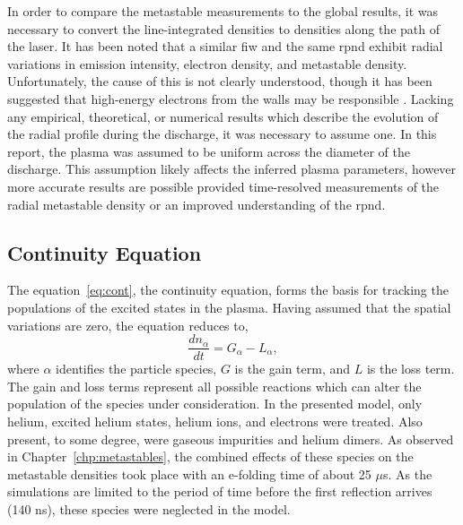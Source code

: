 In order to compare the metastable measurements to the global results, it was
necessary to convert the line-integrated densities to densities along the path
of the laser. It has been noted that a similar \acs{fiw} \cite{Vasilyak1994} and
the same \acs{rpnd} \cite{Weatherford2012} exhibit radial variations in emission
intensity, electron density, and metastable density. Unfortunately, the cause of
this is not clearly understood, though it has been suggested that high-energy
electrons from the walls may be responsible \cite{Weatherford2012a}. Lacking any
empirical, theoretical, or numerical results which describe the evolution of the
radial profile during the discharge, it was necessary to assume one. In this
report, the plasma was assumed to be uniform across the diameter of the
discharge. This assumption likely affects the inferred plasma parameters,
however more accurate results are possible provided time-resolved measurements
of the radial metastable density or an improved understanding of the \acs{rpnd}.

\subsection{Continuity Equation}

The equation~\ref{eq:cont}, the continuity equation, forms the basis for
tracking the populations of the excited states in the plasma. Having assumed
that the spatial variations are zero, the equation reduces to,
\begin{equation}
  \frac{d n_\alpha}{dt} = G_\alpha - L_\alpha,
  \label{eq:zdmcont}
\end{equation}
where $\alpha$ identifies the particle species, $G$ is the gain term, and $L$ is
the loss term. The gain and loss terms represent all possible reactions which
can alter the population of the species under consideration. In the presented
model, only helium, excited helium states, helium ions, and electrons were
treated. Also present, to some degree, were gaseous impurities and helium
dimers. As observed in Chapter~\ref{chp:metastables}, the combined effects of
these species on the metastable densities took place with an e-folding time of
about 25 $\mu$s. As the simulations are limited to the period of time before the
first reflection arrives (140 ns), these species were neglected in the model.

